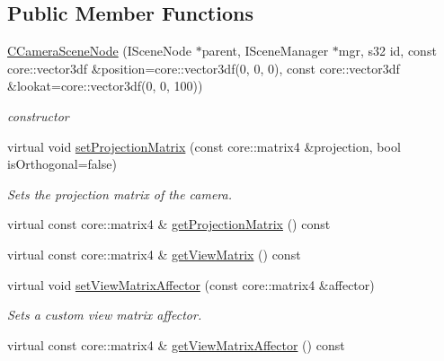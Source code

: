 \subsection*{Public Member Functions}
\begin{DoxyCompactItemize}
\item 
\hypertarget{classirr_1_1scene_1_1_c_camera_scene_node_afb0093484ad13f0595cc93ee8a199d0a}{\hyperlink{classirr_1_1scene_1_1_c_camera_scene_node_afb0093484ad13f0595cc93ee8a199d0a}{C\-Camera\-Scene\-Node} (I\-Scene\-Node $\ast$parent, I\-Scene\-Manager $\ast$mgr, s32 id, const core\-::vector3df \&position=core\-::vector3df(0, 0, 0), const core\-::vector3df \&lookat=core\-::vector3df(0, 0, 100))}\label{classirr_1_1scene_1_1_c_camera_scene_node_afb0093484ad13f0595cc93ee8a199d0a}

\begin{DoxyCompactList}\small\item\em constructor \end{DoxyCompactList}\item 
virtual void \hyperlink{classirr_1_1scene_1_1_c_camera_scene_node_ad2d2b2f9a6f4ce8b0d44ee201ba7a3ae}{set\-Projection\-Matrix} (const core\-::matrix4 \&projection, bool is\-Orthogonal=false)
\begin{DoxyCompactList}\small\item\em Sets the projection matrix of the camera. \end{DoxyCompactList}\item 
virtual const core\-::matrix4 \& \hyperlink{classirr_1_1scene_1_1_c_camera_scene_node_a61da190621c8e7b3c6f782b840dc8354}{get\-Projection\-Matrix} () const 
\item 
virtual const core\-::matrix4 \& \hyperlink{classirr_1_1scene_1_1_c_camera_scene_node_acb871f3a6867b1d9c674ffce80bb1d90}{get\-View\-Matrix} () const 
\item 
virtual void \hyperlink{classirr_1_1scene_1_1_c_camera_scene_node_a4d25347c4505d1c386d1d3dfc4955bae}{set\-View\-Matrix\-Affector} (const core\-::matrix4 \&affector)
\begin{DoxyCompactList}\small\item\em Sets a custom view matrix affector. \end{DoxyCompactList}\item 
\hypertarget{classirr_1_1scene_1_1_c_camera_scene_node_a9888c41b476739a21ff11780a220c446}{virtual const core\-::matrix4 \& \hyperlink{classirr_1_1scene_1_1_c_camera_scene_node_a9888c41b476739a21ff11780a220c446}{get\-View\-Matrix\-Affector} () const }\label{classirr_1_1scene_1_1_c_camera_scene_node_a9888c41b476739a21ff11780a220c446}


\end{DoxyCompactItemize}

